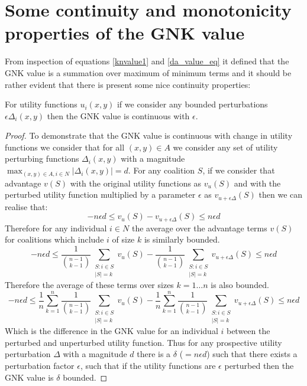 \appendix


\section{Some continuity and monotonicity properties of the GNK value}\label{appendix:continuity_of_GNK}

From inspection of equations \ref{knvalue1} and \ref{da_value_eq} it defined that the GNK value is a summation over maximum of minimum terms and it should be rather evident that there is present some nice continuity properties:

\begin{theorem}
For utility functions $u_i(x,y)$ if we consider any bounded perturbations $\epsilon \Delta_i(x,y)$ then the GNK value is continuous with $\epsilon$.
\end{theorem}
\begin{proof}
To demonstrate that the GNK value is continuous with change in utility functions we consider that for all $(x,y)\in A$ we consider any set of utility perturbing functions $\Delta_i(x,y)$ with a magnitude $\max_{(x,y)\in A, i\in N}|\Delta_i(x,y)| = d$.
For any coalition $S$, if we consider that advantage $v(S)$ with the original utility functions as $v_u(S)$ and with the perturbed utility function multiplied by a parameter $\epsilon$ as $v_{u+\epsilon \Delta}(S)$ then we can realise that:
$$-n\epsilon d \le v_u(S)-v_{u+\epsilon \Delta}(S) \le n\epsilon d$$
Therefore for any individual $i\in N$ the average over the advantage terms $v(S)$ for coalitions which include $i$ of size $k$ is similarly bounded.
$$-n\epsilon d \le \frac{1}{\binom{n-1}{k-1}} \sum_{\substack{S:i\in S \\ |S|=k}}v_u(S)-\frac{1}{\binom{n-1}{k-1}} \sum_{\substack{S:i\in S \\ |S|=k}}v_{u+\epsilon \Delta}(S) \le n\epsilon d$$
Therefore the average of these terms over sizes $k=1\dots n$ is also bounded.
$$-n\epsilon d \le \frac{1}{n}\sum_{k=1}^n \frac{1}{\binom{n-1}{k-1}} \sum_{\substack{S:i\in S \\ |S|=k}}v_u(S)-\frac{1}{n}\sum_{k=1}^n \frac{1}{\binom{n-1}{k-1}} \sum_{\substack{S:i\in S \\ |S|=k}}v_{u+\epsilon \Delta}(S) \le n\epsilon d$$
Which is the difference in the GNK value for an individual $i$ between the perturbed and unperturbed utility function.
Thus for any prospective utility perturbation $\Delta$ with a magnitude $d$ there is a $\delta$ ($=n\epsilon d$) such that there exists a perturbation factor $\epsilon$, such that if the utility functions are $\epsilon$ perturbed then the GNK value is $\delta$ bounded.
\end{proof}

